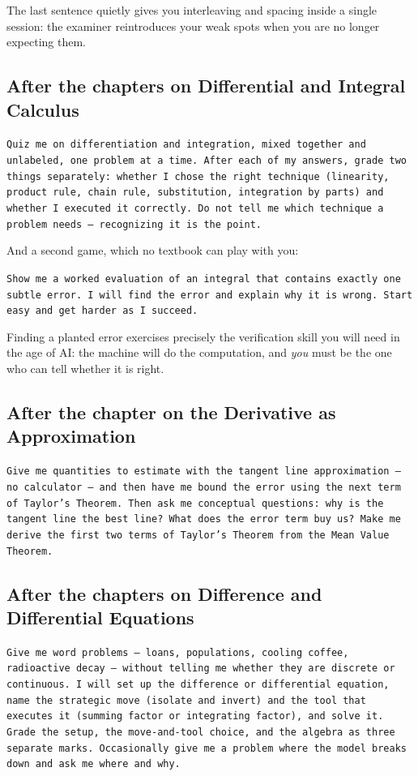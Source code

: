 The last sentence quietly gives you interleaving and spacing inside a
single session: the examiner reintroduces your weak spots when you are
no longer expecting them.

\subsection{After the chapters on Differential and Integral Calculus}
{\medskip\narrower\noindent\raggedright {\tt Quiz me on differentiation and
integration, mixed together and unlabeled, one problem at a time. After
each of my answers, grade two things separately: whether I chose the
right technique (linearity, product rule, chain rule, substitution,
integration by parts) and whether I executed it correctly. Do not tell
me which technique a problem needs -- recognizing it is the point.}%
\par\medskip}

And a second game, which no textbook can play with you:

{\medskip\narrower\noindent\raggedright {\tt Show me a worked evaluation of an
integral that contains exactly one subtle error. I will find the error
and explain why it is wrong. Start easy and get harder as I succeed.}%
\par\medskip}

Finding a planted error exercises precisely the verification skill you
will need in the age of AI: the machine will do the computation, and
{\it you\/} must be the one who can tell whether it is right.

\subsection{After the chapter on the Derivative as Approximation}
{\medskip\narrower\noindent\raggedright {\tt Give me quantities to estimate with
the tangent line approximation -- no calculator -- and then have me
bound the error using the next term of Taylor's Theorem. Then ask me
conceptual questions: why is the tangent line the best line? What does
the error term buy us? Make me derive the first two terms of Taylor's
Theorem from the Mean Value Theorem.}\par\medskip}

\subsection{After the chapters on Difference and Differential Equations}
{\medskip\narrower\noindent\raggedright {\tt Give me word problems -- loans,
populations, cooling coffee, radioactive decay -- without telling me
whether they are discrete or continuous. I will set up the difference
or differential equation, name the strategic move (isolate and invert)
and the tool that executes it (summing factor or integrating factor),
and solve it. Grade the setup, the move-and-tool choice, and the
algebra as three separate marks. Occasionally give me a problem where
the model breaks down and ask me where and why.}\par\medskip}

